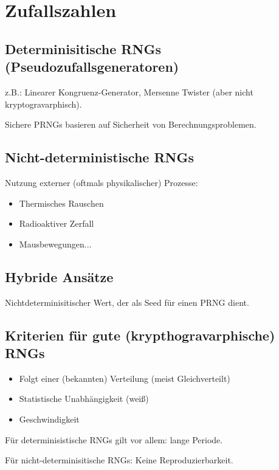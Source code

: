 \section{Zufallszahlen}
\subsection{Determinisitische RNGs (Pseudozufallsgeneratoren)}
z.B.: Linearer Kongruenz-Generator, Mersenne Twister (aber nicht kryptogravarphisch).

Sichere PRNGs basieren auf Sicherheit von Berechnungsproblemen.

\subsection{Nicht-deterministische RNGs}
Nutzung externer (oftmals physikalischer) Prozesse:
\begin{itemize}
    \item Thermisches Rauschen
    \item Radioaktiver Zerfall
    \item Mausbewegungen...
\end{itemize}

\subsection{Hybride Ansätze}
Nichtdeterminisitischer Wert, der als Seed für einen PRNG dient.

\subsection{Kriterien für gute (krypthogravarphische) RNGs}
\begin{itemize}
    \item Folgt einer (bekannten) Verteilung (meist Gleichverteilt)
    \item Statistische Unabhängigkeit (weiß)
    \item Geschwindigkeit
\end{itemize}

Für determinisistische RNGs gilt vor allem: lange Periode.

Für nicht-determinisitische RNGs: Keine Reproduzierbarkeit.


